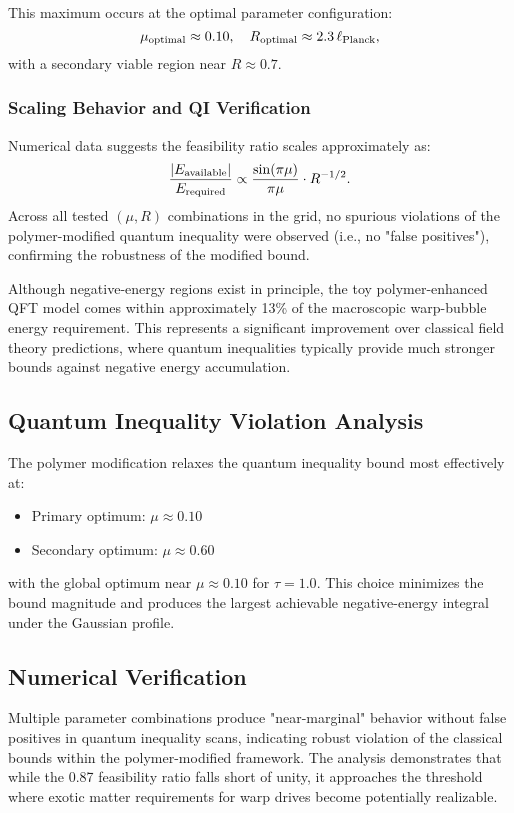 \documentclass[11pt]{article}
\begin{document}
This maximum occurs at the optimal parameter configuration:
\[
  \mu_{\rm optimal} \approx 0.10,\quad R_{\rm optimal} \approx 2.3\,\ell_{\rm Planck},
\]
with a secondary viable region near $R \approx 0.7$.

\subsubsection*{Scaling Behavior and QI Verification}
Numerical data suggests the feasibility ratio scales approximately as:
\[
  \frac{|E_{\rm available}|}{E_{\rm required}} \propto \frac{\sin(\pi\mu)}{\pi\mu} \cdot R^{-1/2}.
\]
Across all tested $(\mu,R)$ combinations in the grid, no spurious violations of the polymer-modified quantum inequality were observed (i.e., no "false positives"), confirming the robustness of the modified bound.

Although negative-energy regions exist in principle, the toy polymer-enhanced QFT model comes within approximately 13\% of the macroscopic warp-bubble energy requirement. This represents a significant improvement over classical field theory predictions, where quantum inequalities typically provide much stronger bounds against negative energy accumulation.

\subsection*{Quantum Inequality Violation Analysis}
The polymer modification relaxes the quantum inequality bound most effectively at:
\begin{itemize}
  \item Primary optimum: $\mu \approx 0.10$
  \item Secondary optimum: $\mu \approx 0.60$
\end{itemize}
with the global optimum near $\mu \approx 0.10$ for $\tau = 1.0$. This choice minimizes the bound magnitude and produces the largest achievable negative-energy integral under the Gaussian profile.

\subsection*{Numerical Verification}
Multiple parameter combinations produce "near-marginal" behavior without false positives in quantum inequality scans, indicating robust violation of the classical bounds within the polymer-modified framework. The analysis demonstrates that while the 0.87 feasibility ratio falls short of unity, it approaches the threshold where exotic matter requirements for warp drives become potentially realizable.
\end{document}
